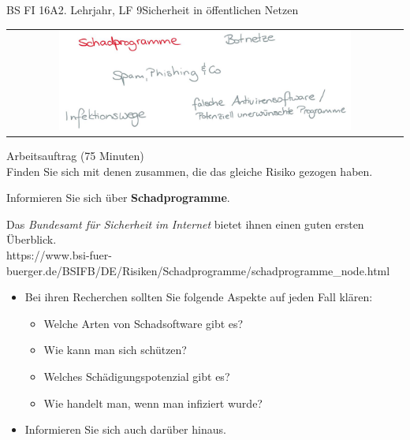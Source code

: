 \documentclass[oneside,openany,headings=optiontotoc,11pt,numbers=noenddot]{scrreprt}
\begin{document}
\begin{worksheet}{BS FI 16A}{2. Lehrjahr, LF 9}{Sicherheit in öffentlichen Netzen}
		\newpage
		\setcounter{page}{1}
		\begin{framed}
			\begin{tabular}{lcr}
				& \includegraphics[width=0.8\textwidth]{Bilder/Schadprogramme.jpg} & \\
			\end{tabular}
		\end{framed}
		\color{codegray}Arbeitsauftrag (75 Minuten)\\
		\color{black}
		Finden Sie sich mit denen zusammen, die das gleiche Risiko gezogen haben.
		\par
		\bigskip
		\noindent
		Informieren Sie sich über \textbf{Schadprogramme}.
		\par\bigskip\noindent
		Das \textit{Bundesamt für Sicherheit im Internet} bietet ihnen einen guten ersten Überblick.\\
		\small{\color{codegray}https://www.bsi-fuer-buerger.de/BSIFB/DE/Risiken/Schadprogramme/schadprogramme\_node.html}
		\normalsize
		\begin{itemize}
			\item[] Bei ihren Recherchen sollten Sie folgende Aspekte auf jeden Fall klären:
			\begin{itemize}
				\item Welche Arten von Schadsoftware gibt es?
				\item Wie kann man sich schützen?
				\item Welches Schädigungspotenzial gibt es?
				\item Wie handelt man, wenn man infiziert wurde?
			\end{itemize}
			\item[] Informieren Sie sich auch darüber hinaus.
		\end{itemize}
	

\end{worksheet}
\end{document}
